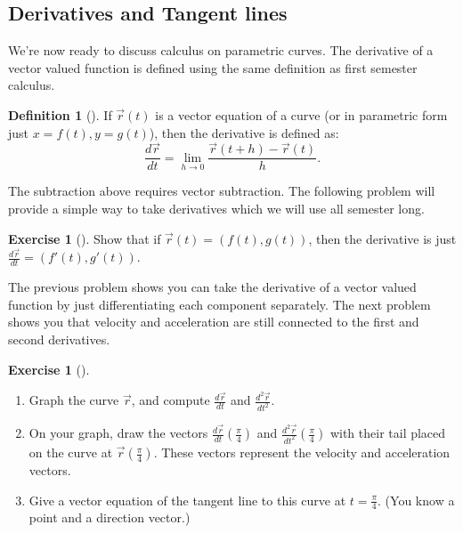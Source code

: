 \documentclass[10pt,]{book}
\theoremstyle{plain}
\theoremstyle{definition}
\newtheorem{definition}[theorem]{Definition}
\theoremstyle{definition}
\theoremstyle{definition}
\theoremstyle{definition}
\newtheorem{exploration}[project]{Exercise}
\theoremstyle{definition}
\numberwithin{equation}{section}
\newcommand{\ds}{\displaystyle}
\begin{document}
\subsection[{Derivatives and Tangent lines}]{Derivatives and Tangent lines}\label{sec_derivatives_and_tangent_lines}
We're now ready to discuss calculus on parametric curves. The derivative of a vector valued function is defined using the same definition as first semester calculus.%
\begin{definition}[{}]\label{definition-19}
If \(\vec r(t)\) is a vector equation of a curve (or in parametric form just \(x=f(t), y=g(t)\)), then the derivative is defined as:%
\begin{equation*}
\frac{d\vec r}{dt}=\ds\lim_{h\to 0}\frac{\vec r(t+h)-\vec r(t)}{h}.
\end{equation*}
%
\end{definition}
The subtraction above requires vector subtraction. The following problem will provide a simple way to take derivatives which we will use all semester long.%
\begin{exploration}[]\label{exploration-77}
Show that if \(\vec r(t) = (f(t),g(t))\), then the derivative is just \(\frac{d\vec r}{dt} = (f'(t),g'(t))\).%
\par
[The definition above says that \(\frac{d\vec r}{dt}=\ds\lim_{h\to 0}\frac{\vec r(t+h)-\vec r(t)}{h}\). We were told \(\vec r(t) = (f(t),g(t))\), so use this in the derivative definition. Then try to modify the equation to obtain \(\frac{d\vec r}{dt} = (f'(t),g'(t))\).]%
\end{exploration}
The previous problem shows you can take the derivative of a vector valued function by just differentiating each component separately. The next problem shows you that velocity and acceleration are still connected to the first and second derivatives.%
\begin{exploration}[]\label{exploration-78}
\leavevmode%
\begin{enumerate}[font=\bfseries,label=(\alph*),ref=\alph*]
\item\label{task-125} Graph the curve \(\vec r\), and compute \(\frac{d\vec r}{dt}\) and \(\frac{d^2\vec r}{dt^2}\).%
\item\label{task-126} On your graph, draw the vectors \(\frac{d\vec r}{dt}\left(\frac{\pi}{4}\right)\) and \(\frac{d^2\vec r}{dt^2}\left(\frac{\pi}{4}\right)\) with their tail placed on the curve at \(\vec r\left(\frac{\pi}{4}\right)\). These vectors represent the velocity and acceleration vectors.%
\item\label{task-127} Give a vector equation of the tangent line to this curve at \(t=\frac{\pi}{4}\). (You know a point and a direction vector.)%
\end{enumerate}
\end{exploration}
\end{document}
